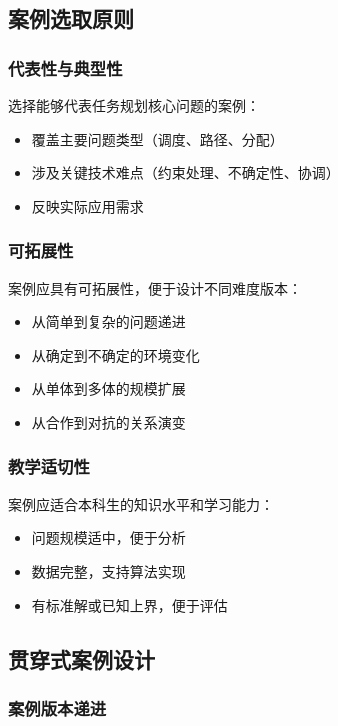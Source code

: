\documentclass[12pt,a4paper]{ctexart}
\begin{document}
\subsection{案例选取原则}

\subsubsection{代表性与典型性}

选择能够代表任务规划核心问题的案例：
\begin{itemize}[leftmargin=2em]
    \item 覆盖主要问题类型（调度、路径、分配）
    \item 涉及关键技术难点（约束处理、不确定性、协调）
    \item 反映实际应用需求
\end{itemize}

\subsubsection{可拓展性}

案例应具有可拓展性，便于设计不同难度版本：
\begin{itemize}[leftmargin=2em]
    \item 从简单到复杂的问题递进
    \item 从确定到不确定的环境变化
    \item 从单体到多体的规模扩展
    \item 从合作到对抗的关系演变
\end{itemize}

\subsubsection{教学适切性}

案例应适合本科生的知识水平和学习能力：
\begin{itemize}[leftmargin=2em]
    \item 问题规模适中，便于分析
    \item 数据完整，支持算法实现
    \item 有标准解或已知上界，便于评估
\end{itemize}

\subsection{贯穿式案例设计}

\subsubsection{案例版本递进}
\end{document}
